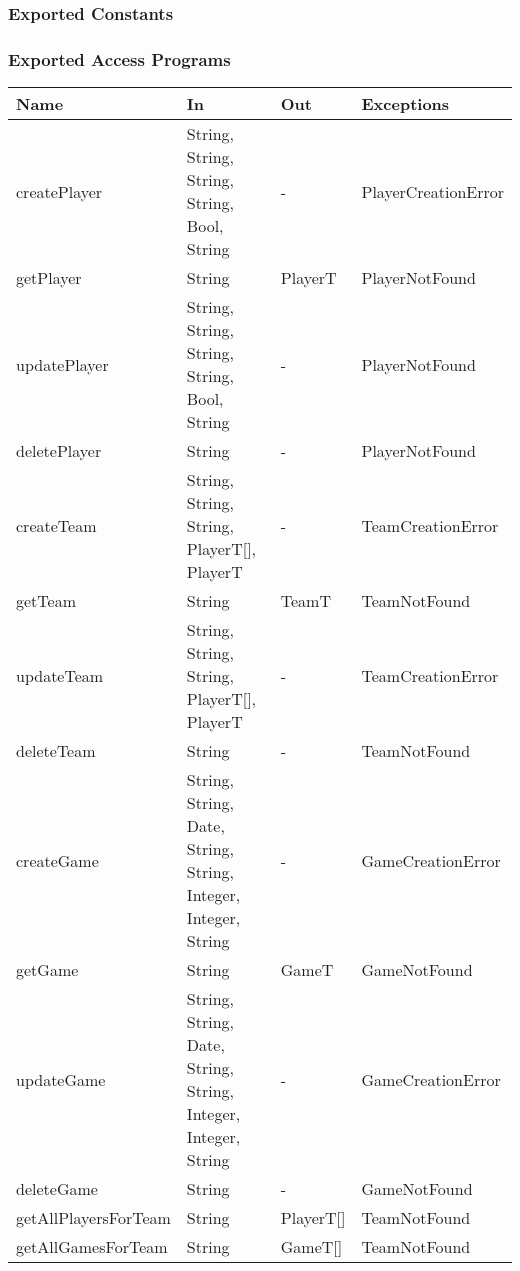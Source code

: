\documentclass[12pt, titlepage]{article}
\begin{document}
\subsubsection{Exported Constants}

\subsubsection{Exported Access Programs}

\begin{center}
  \begin{tabular}{|p{4cm}| p{4cm}| p{4cm} | p{3cm}|}
    \hline
    \textbf{Name}        & \textbf{In}                                                    & \textbf{Out} & \textbf{Exceptions} \\
    \hline
    createPlayer         & String, String, String, String, Bool, String                   & -            & PlayerCreationError \\
    getPlayer            & String                                                         & PlayerT      & PlayerNotFound      \\
    updatePlayer         & String, String, String, String, Bool, String                   & -            & PlayerNotFound      \\
    deletePlayer         & String                                                         & -            & PlayerNotFound      \\
    createTeam           & String, String, String, PlayerT[], PlayerT                     & -            & TeamCreationError   \\
    getTeam              & String                                                         & TeamT        & TeamNotFound        \\
    updateTeam           & String, String, String, PlayerT[], PlayerT                     & -            & TeamCreationError   \\
    deleteTeam           & String                                                         & -            & TeamNotFound        \\
    createGame           & String, String, Date, String, String, Integer, Integer, String & -            & GameCreationError   \\
    getGame              & String                                                         & GameT        & GameNotFound        \\
    updateGame           & String, String, Date, String, String, Integer, Integer, String & -            & GameCreationError   \\
    deleteGame           & String                                                         & -            & GameNotFound        \\
    getAllPlayersForTeam & String                                                         & PlayerT[]    & TeamNotFound        \\
    getAllGamesForTeam   & String                                                         & GameT[]      & TeamNotFound        \\
    \hline
  \end{tabular}
\end{center}
\end{document}
